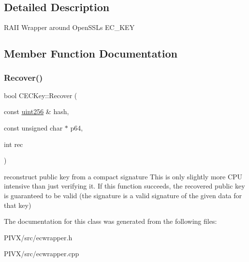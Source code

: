 \subsection{Detailed Description}
R\+A\+II Wrapper around Open\+S\+SL\textquotesingle{}s E\+C\+\_\+\+K\+EY 

\subsection{Member Function Documentation}
\mbox{\label{class_c_e_c_key_a5d7ed3acdc6c2798af3242cacc7b755b}} 
\subsubsection{\texorpdfstring{Recover()}{Recover()}}
{\footnotesize\ttfamily bool C\+E\+C\+Key\+::\+Recover (\begin{DoxyParamCaption}\item[{const \mbox{\hyperlink{classuint256}{uint256}} \&}]{hash,  }\item[{const unsigned char $\ast$}]{p64,  }\item[{int}]{rec }\end{DoxyParamCaption})}

reconstruct public key from a compact signature This is only slightly more C\+PU intensive than just verifying it. If this function succeeds, the recovered public key is guaranteed to be valid (the signature is a valid signature of the given data for that key) 

The documentation for this class was generated from the following files\+:\begin{DoxyCompactItemize}
\item 
P\+I\+V\+X/src/ecwrapper.\+h\item 
P\+I\+V\+X/src/ecwrapper.\+cpp\end{DoxyCompactItemize}
